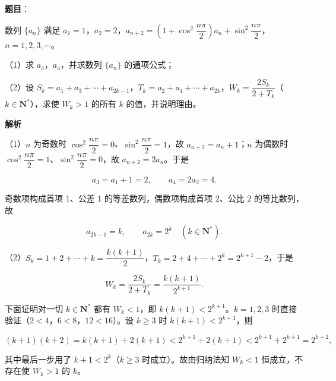 \begin{answer}

\textbf{题目}：

数列 $\{a_n\}$ 满足 $a_1=1$，$a_2=2$，$a_{n+2}=\left(1+\cos^2\dfrac{n\pi}2\right)a_n+\sin^2\dfrac{n\pi}2$，$n=1,2,3,\cdots$。

（1）求 $a_3$，$a_4$，并求数列 $\{a_n\}$ 的通项公式；

（2）设 $S_k=a_1+a_3+\cdots+a_{2k-1}$，$T_k=a_2+a_4+\cdots+a_{2k}$，$W_k=\dfrac{2S_k}{2+T_k}$（$k\in\mathbf N^*$），求使 $W_k>1$ 的所有 $k$ 的值，并说明理由。

\textbf{解析}

（1）$n$ 为奇数时 $\cos^2\dfrac{n\pi}2=0$、$\sin^2\dfrac{n\pi}2=1$，故 $a_{n+2}=a_n+1$；$n$ 为偶数时 $\cos^2\dfrac{n\pi}2=1$、$\sin^2\dfrac{n\pi}2=0$，故 $a_{n+2}=2a_n$。于是

\nopagebreak[4]
\[a_3=a_1+1=2,\qquad a_4=2a_2=4.\]

奇数项构成首项 $1$、公差 $1$ 的等差数列，偶数项构成首项 $2$、公比 $2$ 的等比数列，故

\nopagebreak[4]
\[a_{2k-1}=k,\qquad a_{2k}=2^k\quad(k\in\mathbf N^*).\]

（2）$S_k=1+2+\cdots+k=\dfrac{k(k+1)}2$，$T_k=2+4+\cdots+2^k=2^{k+1}-2$，于是

\nopagebreak[4]
\[W_k=\frac{2S_k}{2+T_k}=\frac{k(k+1)}{2^{k+1}}.\]

下面证明对一切 $k\in\mathbf N^*$ 都有 $W_k<1$，即 $k(k+1)<2^{k+1}$。$k=1,2,3$ 时直接验证（$2<4$，$6<8$，$12<16$）。设 $k\geqslant3$ 时 $k(k+1)<2^{k+1}$，则

\nopagebreak[4]
\[(k+1)(k+2)=k(k+1)+2(k+1)<2^{k+1}+2(k+1)<2^{k+1}+2^{k+1}=2^{k+2},\]

其中最后一步用了 $k+1<2^k$（$k\geqslant3$ 时成立）。故由归纳法知 $W_k<1$ 恒成立，不存在使 $W_k>1$ 的 $k$。


\end{answer}
